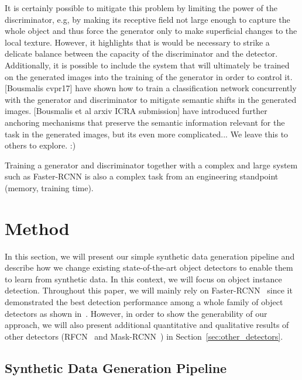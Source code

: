 \documentclass[10pt,twocolumn,letterpaper]{article}
\newcommand{\vincentrmk}[1]{{\color{ForestGreen}\bf #1}}
\newcommand{\comment}[1]{}
\begin{document}
{{It is certainly possible to mitigate this problem by limiting the power of the discriminator, e.g, by making its receptive field not large enough to capture the whole object and thus force the generator only to make superficial changes to the local texture. However, it highlights that is would be necessary to strike a delicate balance between the capacity of the discriminator and the detector.
Additionally, it is possible to include the system that will ultimately be trained on the generated images into the training of the generator in order to control it. [Bousmalis cvpr17] have shown how to train a classification network concurrently with the generator and discriminator to mitigate semantic shifts in the generated images. [Bousmalis et al arxiv ICRA submission] have introduced further anchoring mechanisms that preserve the semantic information relevant for the task in the generated images, but its even more complicated... We leave this to others to explore. :)

Training a generator and discriminator together with a complex and large system such as Faster-RCNN is also a complex task from an engineering standpoint (memory, training time).
}

}







\section{Method}

In this section,  we will present our simple synthetic  data generation pipeline
and describe how we change  existing state-of-the-art object detectors to enable
them to  learn from synthetic  data.  In this context,  we will focus  on object
instance   detection.   Throughout   this  paper,   we  will   mainly  rely   on
Faster-RCNN~\cite{faster_rcnn}   since  it   demonstrated  the   best  detection
performance among a whole family of object detectors as shown in~\cite{Huang17}.
However, in order to show the generability of our approach, we will also present
additional   quantitative   and   qualitative   results   of   other   detectors
(RFCN~\cite{rfcn}          and           Mask-RCNN~\cite{mask_rcnn})          in
Section~\ref{sec:other_detectors}.


\comment{
\vincentrmk{we need to mention https://arxiv.org/pdf/1411.7911.pdf somewhere}
}

\subsection{Synthetic Data Generation Pipeline}
\label{lab:synthetic_data_generation}
\end{document}
